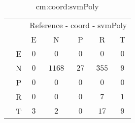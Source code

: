 \begin{table}[!ht]
	\centering
	\begin{tabular}{|c|c|c|c|c|c|c|}
		\cline{3-7}
		\multicolumn{2}{c|}{} & \multicolumn{5}{|c|}{Reference - coord - svmPoly} \\ \cline{3-7}
		\multicolumn{2}{c|}{} & E & N & P & R & T \\ \hline
		\multirow{5}{*}{\rotatebox{90}{Prediction}} & E & $0$ & $0$ & $0$ & $0$ & $0$ \\ \cline{2-7}
		 & N & $0$ & $1168$ & $27$ & $355$ & $9$ \\ \cline{2-7}
		 & P & $0$ & $0$ & $0$ & $0$ & $0$ \\ \cline{2-7}
		 & R & $0$ & $0$ & $0$ & $7$ & $1$ \\ \cline{2-7}
		 & T & $3$ & $2$ & $0$ & $17$ & $9$ \\ \hline
	\end{tabular}
	\caption{cm:coord:svmPoly}
	\label{tab:cm:coord:svmPoly}
\end{table}
